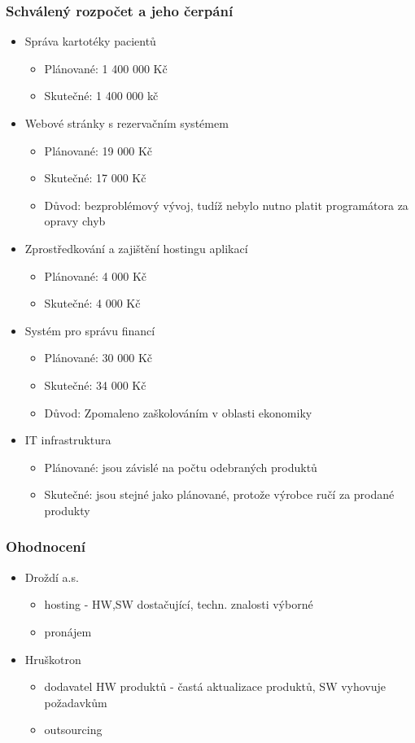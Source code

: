 \documentclass[11pt, a4paper, titlepage]{article}
\begin{document}
	\subsubsection*{Schválený rozpočet a jeho čerpání}
	\begin{itemize}
		\item Správa kartotéky pacientů
		\begin{itemize}
			\item Plánované: 1 400 000 Kč
			\item Skutečné: 1 400 000 kč
		\end{itemize}
		\item Webové stránky s rezervačním systémem
		\begin{itemize}
			\item Plánované: 19 000 Kč
			\item Skutečné: 17 000 Kč
			\item Důvod: bezproblémový vývoj, tudíž nebylo nutno platit programátora za opravy chyb
		\end{itemize}
		\item Zprostředkování a zajištění hostingu aplikací
		\begin{itemize}
			\item Plánované: 4 000 Kč
			\item Skutečné: 4 000 Kč
		\end{itemize}
		\item Systém pro správu financí
		\begin{itemize}
			\item Plánované: 30 000 Kč
			\item Skutečné: 34 000 Kč
			\item Důvod: Zpomaleno zaškolováním v oblasti ekonomiky
		\end{itemize}
		\item IT infrastruktura
		\begin{itemize}
			\item Plánované: jsou závislé na počtu odebraných produktů
			\item Skutečné: jsou stejné jako plánované, protože výrobce ručí za prodané produkty
		\end{itemize}
	\end{itemize}

	\subsubsection*{Ohodnocení}
	\begin{itemize}
		\item Droždí a.s.
		\begin{itemize}
			\item hosting - HW,SW dostačující, techn. znalosti výborné
			\item pronájem
		\end{itemize}
		\item Hruškotron
		\begin{itemize}
			\item dodavatel HW produktů - častá aktualizace produktů, SW vyhovuje požadavkům
			\item outsourcing
		\end{itemize}
	\end{itemize}
	
\end{document}
